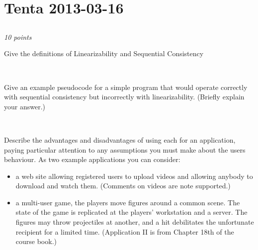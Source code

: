 \documentclass[a4paper]{article}
\newcommand{\points}[1]{\subsection{} \textit{#1 points}\\}
\newcommand{\question}[2][]{
  \parbox[t]{\textwidth}{
    \ifthenelse{\equal{#1}{}}{}{#1)}
    \parbox[t]{0.95\textwidth}{#2}}\\}
\begin{document}
\section{Tenta 2013-03-16}
\points{10}
\label{2013-03:linearizability}
\question[a]{
  Give the definitions of Linearizability and Sequential Consistency
}
\question[b]{
  Give an example pseudocode for a simple program that
  would operate correctly with sequential consistency but incorrectly
  with linearizability. (Briefly explain your answer.)
}
\question[c]{
  Describe the advantages and disadvantages of using each
  for an application, paying particular attention to any assumptions
  you must make about the users behaviour. As two example applications
  you can consider:
  \begin{itemize}
    \item a web site allowing registered users to upload videos and
      allowing anybody to download and watch them. (Comments on videos
      are note supported.)
    \item a multi-user game, the players move figures around a common
      scene. The state of the game is replicated at the players'
      workstation and a server. The figures may throw projectiles at
      another, and a hit debilitates the unfortunate recipient for a
      limited time. (Application II is from Chapter 18th of the course
      book.)
  \end{itemize}
}
\end{document}
